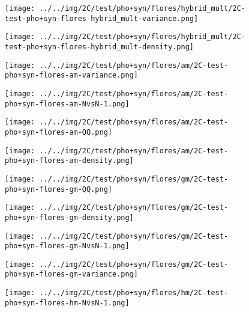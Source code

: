 \begin{figure}[H]
\centering	\texttt{[image: ../../img/2C/test/pho+syn/flores/hybrid\_mult/2C-test-pho+syn-flores-hybrid\_mult-variance.png]}
\end{figure}
\begin{figure}[H]
\centering	\texttt{[image: ../../img/2C/test/pho+syn/flores/hybrid\_mult/2C-test-pho+syn-flores-hybrid\_mult-density.png]}
\end{figure}
\begin{figure}[H]
\centering	\texttt{[image: ../../img/2C/test/pho+syn/flores/am/2C-test-pho+syn-flores-am-variance.png]}
\end{figure}
\begin{figure}[H]
\centering	\texttt{[image: ../../img/2C/test/pho+syn/flores/am/2C-test-pho+syn-flores-am-NvsN-1.png]}
\end{figure}
\begin{figure}[H]
\centering	\texttt{[image: ../../img/2C/test/pho+syn/flores/am/2C-test-pho+syn-flores-am-QQ.png]}
\end{figure}
\begin{figure}[H]
\centering	\texttt{[image: ../../img/2C/test/pho+syn/flores/am/2C-test-pho+syn-flores-am-density.png]}
\end{figure}
\begin{figure}[H]
\centering	\texttt{[image: ../../img/2C/test/pho+syn/flores/gm/2C-test-pho+syn-flores-gm-QQ.png]}
\end{figure}
\begin{figure}[H]
\centering	\texttt{[image: ../../img/2C/test/pho+syn/flores/gm/2C-test-pho+syn-flores-gm-density.png]}
\end{figure}
\begin{figure}[H]
\centering	\texttt{[image: ../../img/2C/test/pho+syn/flores/gm/2C-test-pho+syn-flores-gm-NvsN-1.png]}
\end{figure}
\begin{figure}[H]
\centering	\texttt{[image: ../../img/2C/test/pho+syn/flores/gm/2C-test-pho+syn-flores-gm-variance.png]}
\end{figure}
\begin{figure}[H]
\centering	\texttt{[image: ../../img/2C/test/pho+syn/flores/hm/2C-test-pho+syn-flores-hm-NvsN-1.png]}
\end{figure}
